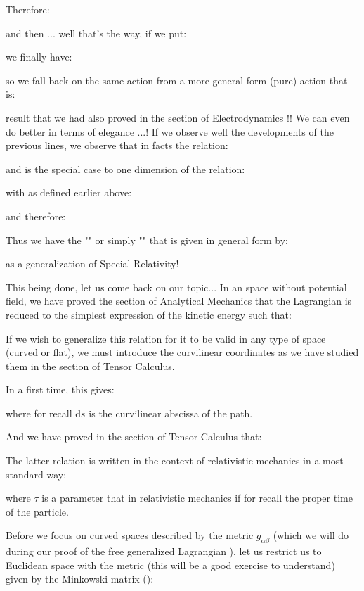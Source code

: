 	Therefore:
	
	and then ... well that's the way, if we put:
	
	we finally have:
	
	so we fall back on the same action from a more general form (pure) action that is:
	
	result that we had also proved in the section of Electrodynamics !! We can even do better in terms of elegance ...! If we observe well the developments of the previous lines, we observe that in facts the relation:
	
	and is the special case to one dimension of the relation:
	
	with as defined earlier above:
	
	and therefore:
	
	Thus we have the "\label{fitzgerald lorentz factor}" or simply "" that is given in general form by:
	
	as a generalization of Special Relativity!

	This being done, let us come back on our topic... In an space without potential field, we have proved the section of Analytical Mechanics that the Lagrangian is reduced to the simplest expression of the kinetic energy such that:
	
	If we wish to generalize this relation for it to be valid in any type of space (curved or flat), we must introduce the curvilinear coordinates as we have studied them in the section of Tensor Calculus.

	In a first time, this gives:
	
	where for recall $\mathrm{d}s$ is the curvilinear abscissa of the path.
	
	And we have proved in the section of Tensor Calculus that:
	
	The latter relation is written in the context of relativistic mechanics in a most standard way:
	
	where $\tau$ is a parameter that in relativistic mechanics if for recall the proper time of the particle.
	
	Before we focus on curved spaces described by the metric $g_{\alpha\beta}$ (which we will do during our proof of the free generalized Lagrangian ), let us restrict us to Euclidean space with the metric (this will be a good exercise to understand) given by the Minkowski matrix ():
	
